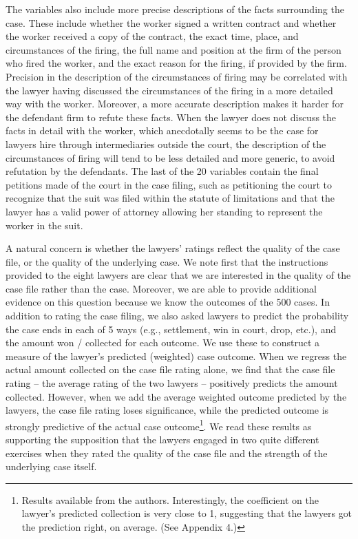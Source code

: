 \documentclass[12 pt]{article}
\begin{document}
The variables also include more precise descriptions of the facts surrounding the case. These include whether the worker signed a written contract and whether the worker received a copy of the contract, the exact time, place, and circumstances of the firing, the full name and position at the firm of the person who fired the worker, and the exact reason for the firing, if provided by the firm. Precision in the description of the circumstances of firing may be correlated with the lawyer having discussed the circumstances of the firing in a more detailed way with the worker. Moreover, a more accurate description makes it harder for the defendant firm to refute these facts. When the lawyer does not discuss the facts in detail with the worker, which anecdotally seems to be the case for lawyers hire through intermediaries outside the court, the description of the circumstances of firing will tend to be less detailed and more generic, to avoid refutation by the defendants. The last of the 20 variables contain the final petitions made of the court in the case filing, such as petitioning the court to recognize that the suit was filed within the statute of limitations and that the lawyer has a valid power of attorney allowing her standing to represent the worker in the suit. 

A natural concern is whether the lawyers’ ratings reflect the quality of the case file, or the quality of the underlying case. We note first that the instructions provided to the eight lawyers are clear that we are interested in the quality of the case file rather than the case. Moreover, we are able to provide additional evidence on this question because we know the outcomes of the 500 cases. In addition to rating the case filing, we also asked lawyers to predict the probability the case ends in each of 5 ways (e.g., settlement, win in court, drop, etc.), and the amount won / collected for each outcome. We use these to construct a measure of the lawyer’s predicted (weighted) case outcome. When we regress the actual amount collected on the case file rating alone, we find that the case file rating – the average rating of the two lawyers – positively predicts the amount collected. However, when we add the average weighted outcome predicted by the lawyers, the case file rating loses significance, while the predicted outcome is strongly predictive of the actual case outcome\footnote{Results available from the authors. Interestingly, the coefficient on the lawyer’s predicted collection is very close to 1, suggesting that the lawyers got the prediction right, on average. (See Appendix 4.)}.  We read these results as supporting the supposition that the lawyers engaged in two quite different exercises when they rated the quality of the case file and the strength of the underlying case itself. 
\end{document}
